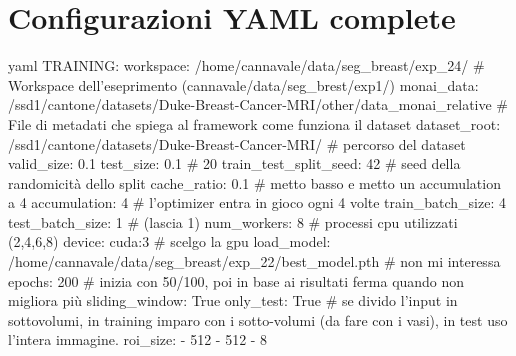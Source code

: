 \appendix

\chapter{Configurazioni YAML complete}
\begin{code}{yaml}
    TRAINING:
  workspace: /home/cannavale/data/seg_breast/exp_24/                                                     # Workspace dell'eseprimento (cannavale/data/seg_brest/exp1/)
  monai_data: /ssd1/cantone/datasets/Duke-Breast-Cancer-MRI/other/data_monai_relative                  # File di metadati che spiega al framework come funziona il dataset
  dataset_root: /ssd1/cantone/datasets/Duke-Breast-Cancer-MRI/                                        # percorso del dataset
  valid_size: 0.1
  test_size: 0.1                                                                                        # 20%
  train_test_split_seed: 42                                                                             # seed della randomicità dello split
  cache_ratio: 0.1                                                                                     # metto basso e metto un accumulation a 4
  accumulation: 4                                                                                      # l'optimizer entra in gioco ogni 4 volte
  train_batch_size: 4                                                                                  
  test_batch_size: 1                                                                                    # (lascia 1)
  num_workers: 8                                                                                 # processi cpu utilizzati (2,4,6,8)
  device: cuda:3                                                                    # scelgo la gpu
  load_model: /home/cannavale/data/seg_breast/exp_22/best_model.pth                                                                                       # non mi interessa
  epochs: 200                                                                                            # inizia con 50/100, poi in base ai risultati ferma quando non migliora più
  sliding_window: True  
  only_test: True                                                                               # se divido l'input in sottovolumi, in training imparo con i sotto-volumi (da fare con i vasi), in test uso l'intera immagine.
  roi_size: 
    - 512
    - 512
    - 8                                                                                       
  

\end{code}
